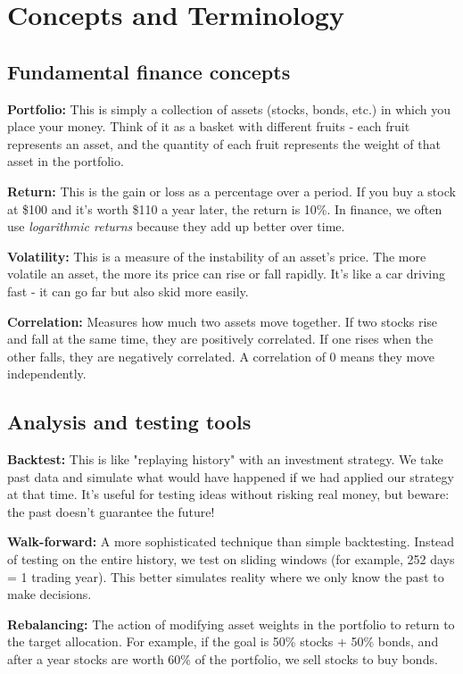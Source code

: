 \documentclass[11pt,a4paper]{article}
\begin{document}
\section{Concepts and Terminology}

\subsection{Fundamental finance concepts}

\textbf{Portfolio:} This is simply a collection of assets (stocks, bonds, etc.) in which you place your money. Think of it as a basket with different fruits - each fruit represents an asset, and the quantity of each fruit represents the weight of that asset in the portfolio.

\textbf{Return:} This is the gain or loss as a percentage over a period. If you buy a stock at \$100 and it's worth \$110 a year later, the return is 10\%. In finance, we often use \emph{logarithmic returns} because they add up better over time.

\textbf{Volatility:} This is a measure of the instability of an asset's price. The more volatile an asset, the more its price can rise or fall rapidly. It's like a car driving fast - it can go far but also skid more easily.

\textbf{Correlation:} Measures how much two assets move together. If two stocks rise and fall at the same time, they are positively correlated. If one rises when the other falls, they are negatively correlated. A correlation of 0 means they move independently.

\subsection{Analysis and testing tools}

\textbf{Backtest:} This is like "replaying history" with an investment strategy. We take past data and simulate what would have happened if we had applied our strategy at that time. It's useful for testing ideas without risking real money, but beware: the past doesn't guarantee the future!

\textbf{Walk-forward:} A more sophisticated technique than simple backtesting. Instead of testing on the entire history, we test on sliding windows (for example, 252 days = 1 trading year). This better simulates reality where we only know the past to make decisions.

\textbf{Rebalancing:} The action of modifying asset weights in the portfolio to return to the target allocation. For example, if the goal is 50\% stocks + 50\% bonds, and after a year stocks are worth 60\% of the portfolio, we sell stocks to buy bonds.
\end{document}
